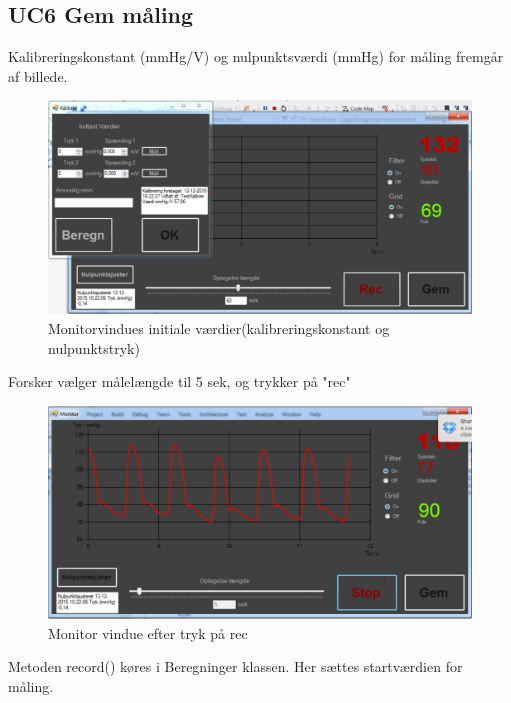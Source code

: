 \subsection{UC6 Gem måling}
Kalibreringskonstant (mmHg/V) og nulpunktsværdi (mmHg) for måling fremgår af billede.
\begin{figure}[H]
	\centering
	\includegraphics[width=1\textwidth]{Figurer/UC6_InitialConditions}
	\caption{Monitorvindues initiale værdier(kalibreringskonstant og nulpunktstryk)}
\end{figure}
 
 Forsker vælger målelængde til 5 sek, og trykker på "rec"
 
\begin{figure}[H]
	\centering
	\includegraphics[width=1\textwidth]{Figurer/UC6_ForceRecEnd}
	\caption{Monitor vindue efter tryk på rec}
\end{figure}

Metoden record() køres i Beregninger klassen. Her sættes startværdien for måling.

